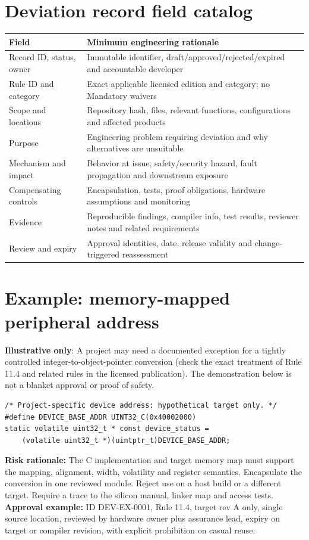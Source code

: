 \documentclass[10pt,letterpaper]{article}
\begin{document}
\section{Deviation record field catalog}
\begin{tabularx}{\linewidth}{@{}p{.26\linewidth}X@{}}\toprule
Field & Minimum engineering rationale\\\midrule
Record ID, status, owner & Immutable identifier, draft/approved/rejected/expired and accountable developer\\
Rule ID and category & Exact applicable licensed edition and category; no Mandatory waivers\\
Scope and locations & Repository hash, files, relevant functions, configurations and affected products\\
Purpose & Engineering problem requiring deviation and why alternatives are unsuitable\\
Mechanism and impact & Behavior at issue, safety/security hazard, fault propagation and downstream exposure\\
Compensating controls & Encapsulation, tests, proof obligations, hardware assumptions and monitoring\\
Evidence & Reproducible findings, compiler info, test results, reviewer notes and related requirements\\
Review and expiry & Approval identities, date, release validity and change-triggered reassessment\\\bottomrule\end{tabularx}
\section{Example: memory-mapped peripheral address}
\begin{keybox}\textbf{Illustrative only}: A project may need a documented exception for a tightly controlled integer-to-object-pointer conversion (check the exact treatment of Rule 11.4 and related rules in the licensed publication). The demonstration below is not a blanket approval or proof of safety.\end{keybox}
\begin{lstlisting}[style=engineerc]
/* Project-specific device address: hypothetical target only. */
#define DEVICE_BASE_ADDR UINT32_C(0x40002000)
static volatile uint32_t * const device_status =
    (volatile uint32_t *)(uintptr_t)DEVICE_BASE_ADDR;
\end{lstlisting}
\textbf{Risk rationale:} The C implementation and target memory map must support the mapping, alignment, width, volatility and register semantics. Encapsulate the conversion in one reviewed module. Reject use on a host build or a different target. Require a trace to the silicon manual, linker map and access tests.
\textbf{Approval example:} ID DEV-EX-0001, Rule 11.4, target rev A only, single source location, reviewed by hardware owner plus assurance lead, expiry on target or compiler revision, with explicit prohibition on casual reuse.
\end{document}
